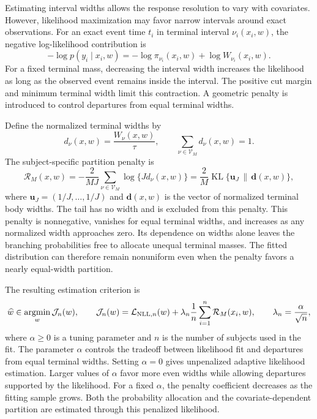 \documentclass[11pt]{article}
\numberwithin{equation}{section}
\begin{document}
Estimating interval widths allows the response resolution to vary with covariates. However, likelihood maximization may favor narrow intervals around exact observations. For an exact event time $t_i$ in terminal interval $\nu_i(x_i,w)$, the negative log-likelihood contribution is
\begin{equation}
    -\log p(y_i\mid x_i,w)
    =-\log\pi_{\nu_i}(x_i,w)+\log W_{\nu_i}(x_i,w).
    \label{eq:likelihood-width-effect}
\end{equation}
For a fixed terminal mass, decreasing the interval width increases the likelihood as long as the observed event remains inside the interval. The positive cut margin and minimum terminal width limit this contraction. A geometric penalty is introduced to control departures from equal terminal widths.

Define the normalized terminal widths by
\[
    d_\nu(x,w)=\frac{W_\nu(x,w)}{\tau},
    \qquad \sum_{\nu\in\mathcal V_M}d_\nu(x,w)=1.
\]
The subject-specific partition penalty is
\begin{equation}
    \mathcal R_M(x,w)
    =-\frac{2}{MJ}\sum_{\nu\in\mathcal V_M}
       \log\{Jd_\nu(x,w)\}
    =\frac{2}{M}\operatorname{KL}\{\mathbf u_J\,\|\,\mathbf d(x,w)\},
    \label{eq:partition-penalty}
\end{equation}
where $\mathbf u_J=(1/J,\ldots,1/J)$ and $\mathbf d(x,w)$ is the vector of normalized terminal body widths. The tail has no width and is excluded from this penalty. This penalty is nonnegative, vanishes for equal terminal widths, and increases as any normalized width approaches zero. Its dependence on widths alone leaves the branching probabilities free to allocate unequal terminal masses. The fitted distribution can therefore remain nonuniform even when the penalty favors a nearly equal-width partition.

The resulting estimation criterion is
\begin{equation}
    \widehat w
    \in\argmin_w\mathcal J_n(w),
    \qquad
    \mathcal J_n(w)
    =\mc L_{\mathrm{NLL},n}(w)
     +\lambda_n\frac{1}{n}\sum_{i=1}^n\mathcal R_M(x_i,w),
    \qquad \lambda_n=\frac{\alpha}{\sqrt n},
    \label{eq:objective}
\end{equation}
where $\alpha\geq0$ is a tuning parameter and $n$ is the number of subjects used in the fit. The parameter $\alpha$ controls the tradeoff between likelihood fit and departures from equal terminal widths. Setting $\alpha=0$ gives unpenalized adaptive likelihood estimation. Larger values of $\alpha$ favor more even widths while allowing departures supported by the likelihood. For a fixed $\alpha$, the penalty coefficient decreases as the fitting sample grows. Both the probability allocation and the covariate-dependent partition are estimated through this penalized likelihood.
\end{document}
